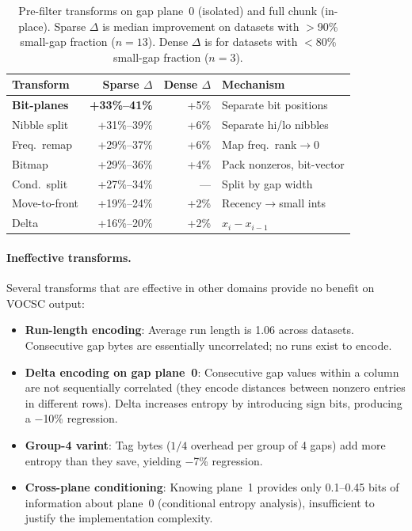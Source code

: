 \documentclass[10pt,twocolumn,letterpaper]{article}
\begin{document}
\begin{table}[h]
\centering
\caption{Pre-filter transforms on gap plane~0 (isolated) and full chunk (in-place). Sparse $\Delta$ is median improvement on datasets with $>$90\% small-gap fraction ($n = 13$). Dense $\Delta$ is for datasets with $<$80\% small-gap fraction ($n = 3$).}
\label{tab:transforms}
\footnotesize
\begin{tabular}{lrrl}
\toprule
Transform & Sparse $\Delta$ & Dense $\Delta$ & Mechanism \\
\midrule
\textbf{Bit-planes}   & \textbf{+33\%--41\%} & +5\%  & Separate bit positions \\
Nibble split           & +31\%--39\% & +6\%  & Separate hi/lo nibbles \\
Freq.\ remap           & +29\%--37\% & +6\%  & Map freq.\ rank$\to$0 \\
Bitmap                 & +29\%--36\% & +4\%  & Pack nonzeros, bit-vector \\
Cond.\ split           & +27\%--34\% & ---   & Split by gap width \\
Move-to-front          & +19\%--24\% & +2\%  & Recency$\to$small ints \\
Delta                  & +16\%--20\% & +2\%  & $x_i - x_{i-1}$ \\
\bottomrule
\end{tabular}
\end{table}

\paragraph{Ineffective transforms.}
Several transforms that are effective in other domains provide no benefit on VOCSC output:
\begin{itemize}
\item \textbf{Run-length encoding}: Average run length is 1.06 across datasets.  Consecutive gap bytes are essentially uncorrelated; no runs exist to encode.
\item \textbf{Delta encoding on gap plane~0}: Consecutive gap values within a column are not sequentially correlated (they encode distances between nonzero entries in different rows).  Delta increases entropy by introducing sign bits, producing a $-$10\% regression.
\item \textbf{Group-4 varint}: Tag bytes ($1/4$ overhead per group of 4 gaps) add more entropy than they save, yielding $-$7\% regression.
\item \textbf{Cross-plane conditioning}: Knowing plane~1 provides only 0.1--0.45 bits of information about plane~0 (conditional entropy analysis), insufficient to justify the implementation complexity.
\end{itemize}
\end{document}
